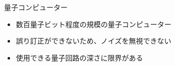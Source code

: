 \documentclass[dvipdfmx,10pt,aspectratio=169]{beamer}
\begin{document}
\begin{frame}{量子コンピューター}
    \begin{center}
        {\large\colorbox{blue!40}{}}
    \end{center}

    \begin{center}
        \begin{minipage}{0.7\textwidth}
            \begin{itemize}
                \item 数百量子ビット程度の規模の量子コンピューター\\
                \item 誤り訂正ができないため、ノイズを無視できない\\
                \item 使用できる量子回路の深さに限界がある
            \end{itemize}
        \end{minipage}
    \end{center}

\end{frame}



\newcommand{\tabitem}{\usebeamertemplate{itemize item}\hspace*{\labelsep}}
\end{document}
